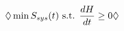 \documentclass[preview]{standalone}
\begin{document}
\begin{align*}
\special{dvisvgm:raw <g id='unique000'>}\Diamond \min S_{sys}(t) \text{ s.t. } \frac{dH}{dt} \geq 0 \Diamond\special{dvisvgm:raw </g>}
\end{align*}
\end{document}
